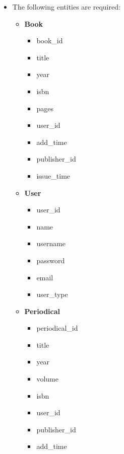 \documentclass{article}
\begin{document}
\begin{itemize}
    \item The following entities are required:
        \begin{itemize}
            \item \textbf{Book}
                \begin{itemize}
                    \item {\color{blue}book\_id}
                    \item title
                    \item year
                    \item isbn
                    \item pages
                    \item {\color{red}user\_id}
                    \item add\_time
                    \item {\color{red}publisher\_id}
                    \item issue\_time
                \end{itemize}
            \item \textbf{User}
                \begin{itemize}
                    \item {\color{blue}user\_id}
                    \item name
                    \item username
                    \item password
                    \item email
                    \item {\color{green}user\_type}
                \end{itemize}
            \item \textbf{Periodical}
                \begin{itemize}
                    \item {\color{blue}periodical\_id}
                    \item title
                    \item year
                    \item volume
                    \item isbn
                    \item {\color{red}user\_id}
                    \item {\color{red}publisher\_id}
                    \item add\_time

\end{itemize}
\end{itemize}
\end{itemize}
\end{document}
